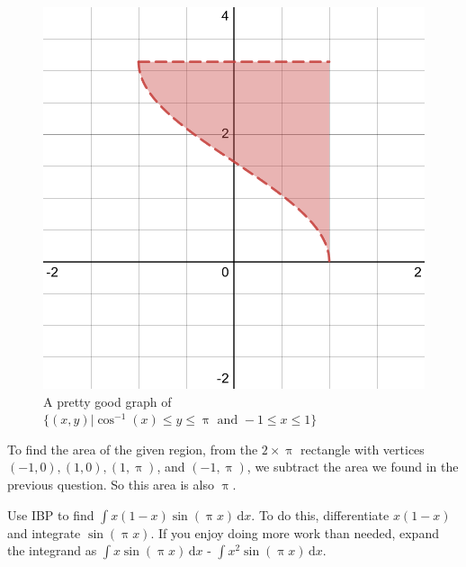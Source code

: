 \documentclass[12pt,fleqn,answers]{exam}
\begin{document}
\begin{questions}
\begin{figure}[h]
    \begin{center}
    \includegraphics[scale=0.15]{desmos-graph(59).png}
    \end{center}
    \caption{A pretty good graph of $\{(x,y) | \cos^{-1}(x) \leq y 
    \leq \uppi \mbox{ and }  -1 \leq x \leq 1 \}$}
    \end{figure}

    \begin{solution}[2.8in]
        To find the area of the given region, from the
         $2 \times \uppi $ rectangle with vertices
         $(-1,0), (1,0), (1, \uppi)$, and $(-1, \uppi)$, we 
         subtract the 
         area we found in the previous question. So this
         area is also $\uppi$.
    \end{solution}

\question [2] Use IBP to find $\int x (1-x) \sin (\uppi x) \, \mathrm{d} x$.
To do this, differentiate $x (1-x)$ and integrate $\sin (\uppi x)$.
If you enjoy doing more work than needed, expand the 
integrand as $\int x  \sin (\uppi x) \, \mathrm{d} x$ - 
$\int x^2 \sin (\uppi x) \, \mathrm{d} x$.


\end{questions}
\end{document}
